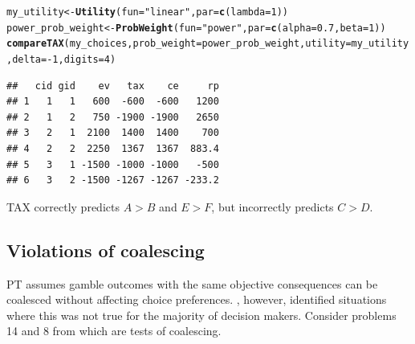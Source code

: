 \documentclass{article}\usepackage[]{graphicx}\usepackage[]{color}
\makeatletter
\newcommand{\hlnum}[1]{\textcolor[rgb]{0.686,0.059,0.569}{#1}}%
\newcommand{\hlstr}[1]{\textcolor[rgb]{0.192,0.494,0.8}{#1}}%
\newcommand{\hlopt}[1]{\textcolor[rgb]{0,0,0}{#1}}%
\newcommand{\hlstd}[1]{\textcolor[rgb]{0.345,0.345,0.345}{#1}}%
\newcommand{\hlkwb}[1]{\textcolor[rgb]{0.69,0.353,0.396}{#1}}%
\newcommand{\hlkwc}[1]{\textcolor[rgb]{0.333,0.667,0.333}{#1}}%
\newcommand{\hlkwd}[1]{\textcolor[rgb]{0.737,0.353,0.396}{\textbf{#1}}}%
\newenvironment{kframe}{%
 \def\at@end@of@kframe{}%
 \ifinner\ifhmode%
  \def\at@end@of@kframe{\end{minipage}}%
  \begin{minipage}{\columnwidth}%
 \fi\fi%
 \def\FrameCommand##1{\hskip\@totalleftmargin \hskip-\fboxsep
 \colorbox{shadecolor}{##1}\hskip-\fboxsep
     \hskip-\linewidth \hskip-\@totalleftmargin \hskip\columnwidth}%
 \MakeFramed {\advance\hsize-\width
   \@totalleftmargin\z@ \linewidth\hsize
   \@setminipage}}%
 {\par\unskip\endMakeFramed%
 \at@end@of@kframe}
\newenvironment{knitrout}{}{} %
\makeatother
\begin{document}
\begin{knitrout}
\color{fgcolor}\begin{kframe}
\begin{alltt}
\hlstd{my_utility} \hlkwb{<-} \hlkwd{Utility}\hlstd{(}\hlkwc{fun}\hlstd{=}\hlstr{"linear"}\hlstd{,} \hlkwc{par}\hlstd{=}\hlkwd{c}\hlstd{(}\hlkwc{lambda}\hlstd{=}\hlnum{1}\hlstd{))}
\hlstd{power_prob_weight} \hlkwb{<-} \hlkwd{ProbWeight}\hlstd{(}\hlkwc{fun}\hlstd{=}\hlstr{"power"}\hlstd{,} \hlkwc{par}\hlstd{=}\hlkwd{c}\hlstd{(}\hlkwc{alpha}\hlstd{=}\hlnum{0.7}\hlstd{,} \hlkwc{beta}\hlstd{=}\hlnum{1}\hlstd{))}
\hlkwd{compareTAX}\hlstd{(my_choices,} \hlkwc{prob_weight}\hlstd{=power_prob_weight,} \hlkwc{utility}\hlstd{=my_utility,} \hlkwc{delta}\hlstd{=}\hlopt{-}\hlnum{1}\hlstd{,} \hlkwc{digits}\hlstd{=}\hlnum{4}\hlstd{)}
\end{alltt}
\begin{verbatim}
##   cid gid    ev   tax    ce     rp
## 1   1   1   600  -600  -600   1200
## 2   1   2   750 -1900 -1900   2650
## 3   2   1  2100  1400  1400    700
## 4   2   2  2250  1367  1367  883.4
## 5   3   1 -1500 -1000 -1000   -500
## 6   3   2 -1500 -1267 -1267 -233.2
\end{verbatim}
\end{kframe}
\end{knitrout}


TAX correctly predicts $A > B$ and $E > F$, but incorrectly predicts $C > D$.

\subsection{Violations of coalescing}

PT assumes gamble outcomes with the same objective consequences can be coalesced without affecting choice preferences. \cite{Birnbaum_2004}, however, identified situations
where this was not true for the majority of decision makers. Consider problems 14 and 8 from \citet[][Table 3 p. 95]{Birnbaum_2004} which are tests of coalescing.
\end{document}
